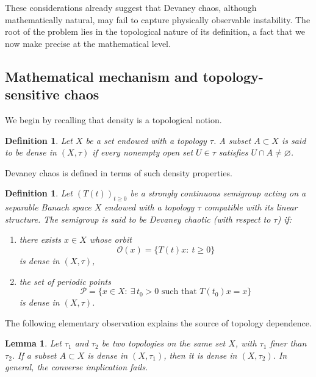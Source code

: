 \documentclass[12pt]{article}
\newtheorem{lemma}[theorem]{Lemma}
\newtheorem{definition}[theorem]{Definition}
\begin{document}
These considerations already suggest that Devaney chaos, although mathematically natural, may fail to capture physically observable instability. The root of the problem lies in the topological nature of its definition, a fact that we now make precise at the mathematical level.

\subsection{Mathematical mechanism and topology-sensitive chaos}
\label{subsec:topology_mechanism}

We begin by recalling that density is a topological notion.

\begin{definition}
Let $X$ be a set endowed with a topology $\tau$. A subset $A\subset X$ is said to be \emph{dense} in $(X,\tau)$ if every nonempty open set $U\in\tau$ satisfies $U\cap A\neq\varnothing$.
\end{definition}

Devaney chaos is defined in terms of such density properties.

\begin{definition}{\cite{DeschSchappacherWebb1997}}
Let $(T(t))_{t\ge0}$ be a strongly continuous semigroup acting on a separable Banach space $X$ endowed with a topology $\tau$ compatible with its linear structure. The semigroup is said to be \emph{Devaney chaotic} (with respect to $\tau$) if:
\begin{enumerate}
\item there exists $x\in X$ whose orbit
\[
\mathcal{O}(x)=\{T(t)x:\ t\ge0\}
\]
is dense in $(X,\tau)$,
\item the set of periodic points
\[
\mathcal{P}
=\{x\in X:\ \exists\, t_0>0 \text{ such that } T(t_0)x=x\}
\]
is dense in $(X,\tau)$.
\end{enumerate}
\end{definition}

The following elementary observation explains the source of topology dependence.

\begin{lemma}\label{lem:finer_coarser}
Let $\tau_1$ and $\tau_2$ be two topologies on the same set $X$, with $\tau_1$ finer than $\tau_2$. If a subset $A\subset X$ is dense in $(X,\tau_1)$, then it is dense in $(X,\tau_2)$. In general, the converse implication fails.
\end{lemma}
\end{document}
